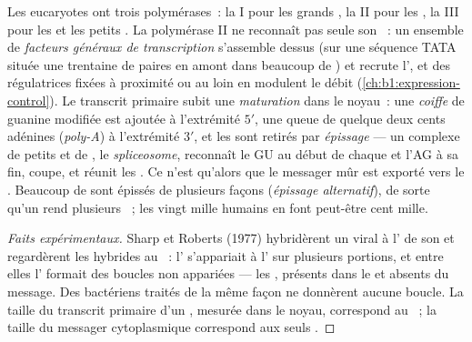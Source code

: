 \begin{proposition}\label{prop:b1:gene-expression:processing}
Les eucaryotes ont trois polymérases~: la I pour les grands , la II pour les , la III pour les  et les petits . La polymérase II ne reconnaît pas seule son
~: un ensemble de \emph{facteurs généraux de transcription}
s'assemble dessus (sur une séquence TATA située une trentaine de paires
en amont dans beaucoup de ) et recrute l', et des 
régulatrices fixées à proximité ou au loin en modulent le débit
(\cref{ch:b1:expression-control}). Le transcrit primaire subit une
\emph{maturation} dans le noyau~: une \emph{coiffe} de guanine modifiée
est ajoutée à l'extrémité $5'$, une queue de quelque deux cents adénines
(\emph{poly-A}) à l'extrémité $3'$, et les  sont retirés par
\emph{épissage} --- un complexe de petits  et de , le
\emph{spliceosome}, reconnaît le GU au début de chaque  et l'AG à
sa fin, coupe, et réunit les . Ce n'est qu'alors que le messager
mûr est exporté vers le . Beaucoup de  sont épissés de
plusieurs façons (\emph{épissage alternatif}), de sorte qu'un  rend
plusieurs ~; les vingt mille  humains en font peut-être
cent mille.
\end{proposition}
\begin{proof}[Faits expérimentaux]
Sharp et Roberts (1977) hybridèrent un  viral à l' de son
 et regardèrent les hybrides au ~: l'
s'appariait à l' sur plusieurs portions, et entre elles l'
formait des boucles non appariées --- les , présents dans le 
et absents du message. Des  bactériens traités de la même façon ne
donnèrent aucune boucle. La taille du transcrit primaire d'un ,
mesurée dans le noyau, correspond au ~; la taille du messager
cytoplasmique correspond aux seuls .
\end{proof}


